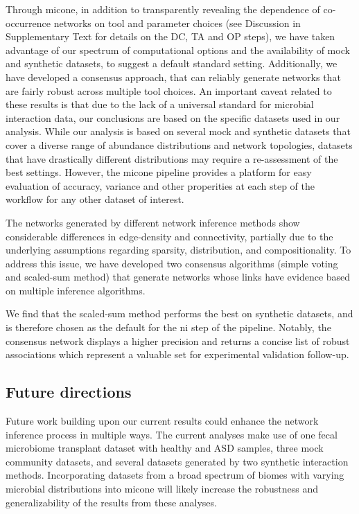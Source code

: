\documentclass[letterpaper,12pt]{article}
\begin{document}
  Through \ac{micone}, in addition to transparently revealing the dependence of co-occurrence networks on tool and parameter choices (see Discussion in Supplementary Text for details on the DC, TA and OP steps), we have taken advantage of our spectrum of computational options and the availability of mock and synthetic datasets, to suggest a default standard setting.
  Additionally, we have developed a consensus approach, that can reliably generate networks that are fairly robust across multiple tool choices.
  An important caveat related to these results is that due to the lack of a universal standard for microbial interaction data, our conclusions are based on the specific datasets used in our analysis.
  While our analysis is based on several mock and synthetic datasets that cover a diverse range of abundance distributions and network topologies, datasets that have drastically different distributions may require a re-assessment of the best settings.
  However, the \ac{micone} pipeline provides a platform for easy evaluation of accuracy, variance and other properities at each step of the workflow for any other dataset of interest.

  The networks generated by different network inference methods show considerable differences in edge-density and connectivity, partially due to the underlying assumptions regarding sparsity, distribution, and compositionality.
  To address this issue, we have developed two consensus algorithms (simple voting and scaled-sum method) that generate networks whose links have evidence based on multiple inference algorithms.

 We find that the scaled-sum method performs the best on synthetic datasets, and is therefore chosen as the default for the \ac{ni} step of the pipeline.
 Notably, the consensus network displays a higher precision and returns a concise list of robust associations which represent a valuable set for experimental validation follow-up.

  \subsection*{Future directions}

  Future work building upon our current results could enhance the network inference process in multiple ways.
  The current analyses make use of one fecal microbiome transplant dataset with healthy and ASD samples, three mock community datasets, and several datasets generated by two synthetic interaction methods.
  Incorporating datasets from a broad spectrum of biomes with varying microbial distributions into \ac{micone} will likely increase the robustness and generalizability of the results from these analyses.
\end{document}
